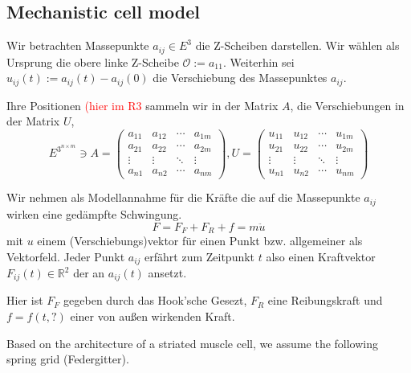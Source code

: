 \subsection*{Mechanistic cell model}

Wir betrachten Massepunkte $a_{ij} \in E^3$ die Z-Scheiben darstellen. Wir wählen als Ursprung die obere linke Z-Scheibe $\mathcal{O}:= a_{11}$. Weiterhin sei $u_{ij}(t) := a_{ij}(t) - a_{ij}(0)$ die Verschiebung des Massepunktes $a_{ij}$.

Ihre Positionen \textcolor{red}{(hier im R3} sammeln wir in der Matrix $A$, die Verschiebungen in der Matrix $U$,
\begin{equation*}
	E^{3^{n \times m}} \ni A=
\begin{pmatrix}
a_{11} & a_{12} & \cdots & a_{1m} \\
a_{21} & a_{22} & \cdots & a_{2m} \\
\vdots & \vdots & \ddots & \vdots \\
a_{n1} & a_{n2} & \cdots & a_{nm}
\end{pmatrix}, U=
\begin{pmatrix}
u_{11} & u_{12} & \cdots & u_{1m} \\
u_{21} & u_{22} & \cdots & u_{2m} \\
\vdots & \vdots & \ddots & \vdots \\
u_{n1} & u_{n2} & \cdots & u_{nm}
\end{pmatrix}
\end{equation*}



Wir nehmen als Modellannahme für die Kräfte die auf die Massepunkte $a_{ij}$ wirken eine gedämpfte Schwingung.
\begin{equation*}
	F = F_F + F_R + f = m \ddot{u}
\end{equation*}
mit $u$ einem (Verschiebungs)vektor für einen Punkt bzw. allgemeiner als Vektorfeld. Jeder Punkt $a_{ij}$ erfährt zum Zeitpunkt $t$ also einen Kraftvektor $F_{ij}(t) \in \mathbb{R}^2$ der an $a_{ij}(t)$ ansetzt.


Hier ist $F_F$ gegeben durch das Hook'sche Gesezt, $F_R$ eine Reibungskraft und $f=f(t, ?)$ einer von außen wirkenden Kraft.

Based on the architecture of a striated muscle cell, we assume the following spring grid (Federgitter).

